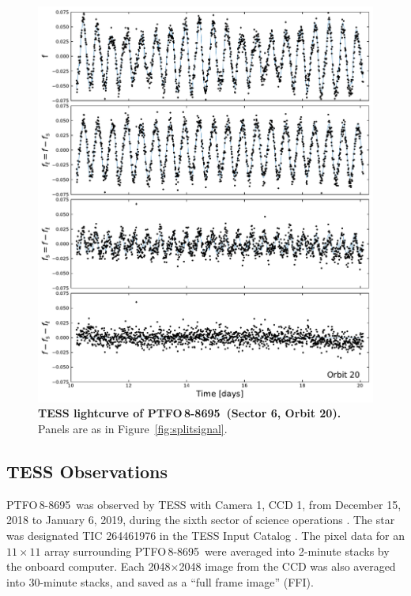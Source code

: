 \documentclass[12pt,twocolumn,tighten]{aastex62}
\newcommand{\ptfo}{PTFO$\,$8-8695}
\begin{document}
\begin{figure}[hbtp]
	\begin{center}
		\leavevmode
		\includegraphics[width=1\textwidth]{f2.pdf}
	\end{center}
	\vspace{-0.7cm}
  \caption{ {\bf TESS lightcurve of \ptfo\ (Sector 6, Orbit 20).}
		Panels are as in Figure~\ref{fig:splitsignal}.
		\label{fig:splitsignalii}
	}
\end{figure}

\subsection{TESS Observations}

\ptfo\ was observed by TESS with Camera 1, CCD 1, from December 15,
2018 to January 6, 2019, during the sixth sector of science operations
\citep{ricker_transiting_2015}.  The star was designated TIC 264461976
in the TESS Input Catalog \citep{stassun_TIC_2018,stassun_TIC8_2019}.
The pixel data for an $11\times11$ array surrounding \ptfo\ were
averaged into 2-minute stacks by the onboard computer.  Each
2048$\times$2048 image from the CCD was also averaged into 30-minute
stacks, and saved as a ``full frame image'' (FFI).
\end{document}
